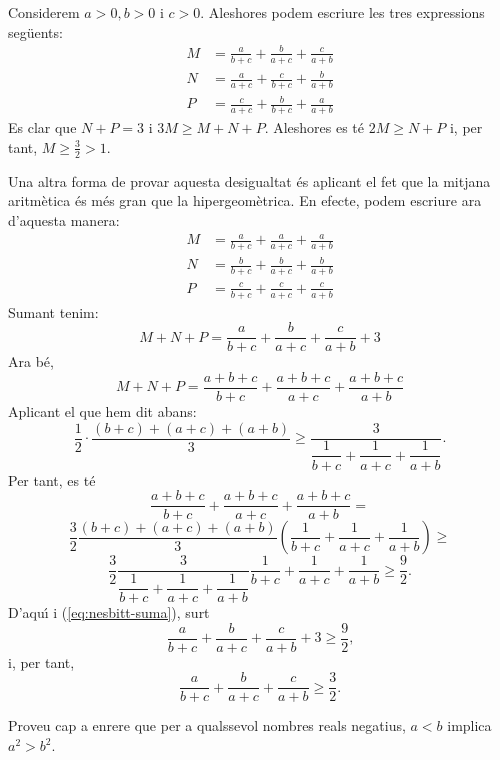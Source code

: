 \begin{solucio}
Considerem $a>0,b>0$ i $c>0$. Aleshores podem escriure les tres expressions
seg\"{u}ents:%
\begin{align*}
M  &  =\frac{a}{b+c}+\frac{b}{a+c}+\frac{c}{a+b}\\
N  &  =\frac{a}{a+c}+\frac{c}{b+c}+\frac{b}{a+b}\\
P  &  =\frac{c}{a+c}+\frac{b}{b+c}+\frac{a}{a+b}%
\end{align*}
Es clar que $N+P=3$ i $3M\geq M+N+P$. Aleshores es t\'{e} $2M\geq N+P$ i, per
tant, $M\geq\frac{3}{2}>1$.

Una altra forma de provar aquesta desigualtat \'{e}s aplicant el fet que la
mitjana aritm\`{e}tica \'{e}s m\'{e}s gran que la hipergeom\`{e}trica. En
efecte, podem escriure ara d'aquesta manera:
\begin{align*}
M  &  =\frac{a}{b+c}+\frac{a}{a+c}+\frac{a}{a+b}\\
N  &  =\frac{b}{b+c}+\frac{b}{a+c}+\frac{b}{a+b}\\
P  &  =\frac{c}{b+c}+\frac{c}{a+c}+\frac{c}{a+b}%
\end{align*}
Sumant tenim:%
\begin{equation}
M+N+P=\frac{a}{b+c}+\frac{b}{a+c}+\frac{c}{a+b}+3 \label{eq:nesbitt-suma}%
\end{equation}
Ara b\'{e},%
\[
M+N+P=\frac{a+b+c}{b+c}+\frac{a+b+c}{a+c}+\frac{a+b+c}{a+b}%
\]
Aplicant el que hem dit abans:\qquad%
\[
\frac{1}{2}\cdot\frac{(b+c)+(a+c)+(a+b)}{3}\geq\frac{3}{\dfrac{1}{b+c}%
+\dfrac{1}{a+c}+\dfrac{1}{a+b}}\text{.}%
\]
Per tant, es t\'{e}%
\[
\frac{a+b+c}{b+c}+\frac{a+b+c}{a+c}+\frac{a+b+c}{a+b}=
\]%
\[
\frac{3}{2}\frac{(b+c)+(a+c)+(a+b)}{3}\left(  \dfrac{1}{b+c}+\dfrac{1}%
{a+c}+\dfrac{1}{a+b}\right)  \geq
\]%
\[
\frac{3}{2}\frac{3}{\dfrac{1}{b+c}+\dfrac{1}{a+c}+\dfrac{1}{a+b}}\dfrac
{1}{b+c}+\dfrac{1}{a+c}+\dfrac{1}{a+b}\geq\frac{9}{2}\text{.}%
\]
D'aqu\'{\i} i (\ref{eq:nesbitt-suma}), surt%
\[
\frac{a}{b+c}+\frac{b}{a+c}+\frac{c}{a+b}+3\geq\frac{9}{2}\text{,}%
\]
i, per tant,%
\[
\frac{a}{b+c}+\frac{b}{a+c}+\frac{c}{a+b}\geq\frac{3}{2}\text{.}%
\]

\end{solucio}

\begin{exercici}
Proveu cap a enrere que per a qualssevol nombres reals negatius, $a<b$ implica
$a^{2}>b^{2}$.
\end{exercici}

